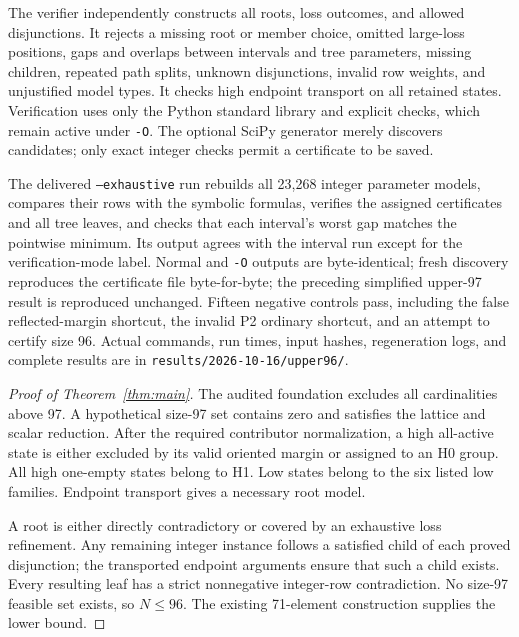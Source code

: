 \documentclass[11pt,a4paper]{article}
\begin{document}
The verifier independently constructs all roots, loss outcomes, and
allowed disjunctions. It rejects a missing root or member choice, omitted
large-loss positions, gaps and overlaps between intervals and tree
parameters, missing children, repeated path splits, unknown disjunctions,
invalid row weights, and unjustified model types. It checks high endpoint
transport on all retained states. Verification uses only the Python
standard library and explicit checks, which remain active under
\texttt{-O}. The optional SciPy generator merely discovers candidates;
only exact integer checks permit a certificate to be saved.

The delivered \texttt{--exhaustive} run rebuilds all 23,268 integer
parameter models, compares their rows with the symbolic formulas,
verifies the assigned certificates and all tree leaves, and checks that
each interval's worst gap matches the pointwise minimum. Its output
agrees with the interval run except for the verification-mode label.
Normal and \texttt{-O} outputs are byte-identical; fresh discovery
reproduces the certificate file byte-for-byte; the preceding simplified
upper-97 result is reproduced unchanged. Fifteen negative controls pass,
including the false reflected-margin shortcut, the invalid P2 ordinary
shortcut, and an attempt to certify size 96.
Actual commands, run times, input hashes, regeneration logs, and complete
results are in \texttt{results/2026-10-16/upper96/}.

\begin{proof}[Proof of Theorem~\ref{thm:main}]
The audited foundation excludes all cardinalities above 97. A hypothetical
size-97 set contains zero and satisfies the lattice and scalar reduction.
After the required contributor normalization, a high all-active state is
either excluded by its valid oriented margin or assigned to an H0 group.
All high one-empty states belong to H1. Low states belong to the six
listed low families. Endpoint transport gives a necessary root model.

A root is either directly contradictory or covered by an exhaustive
loss refinement. Any remaining integer instance follows a satisfied
child of each proved disjunction; the transported endpoint arguments
ensure that such a child exists. Every resulting leaf has a strict
nonnegative integer-row contradiction. No size-97 feasible set exists,
so $N\le96$. The existing 71-element construction supplies the lower bound.
\end{proof}
\end{document}
